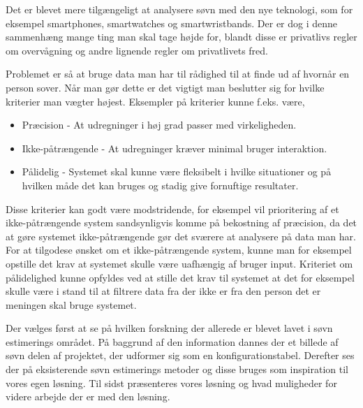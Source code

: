 \begin{comment}
Dette kapitel indeholder forskning omkring søvn, hvor forskellige metoder til at detektere søvn bliver beskrevet.
Hvorefter metoderne bliver sammenlignet med hinanden for at se på hvilket metoder vil kunne bruges til dette projekt.
Til slut vil der blive set på en enkelt metode i dybden som et proof of concept.
\end{comment}
Det er blevet mere tilgængeligt at analysere søvn med den nye teknologi, som for eksempel smartphones, smartwatches og smartwristbands.
Der er dog i denne sammenhæng mange ting man skal tage højde for, blandt disse er privatlivs regler om overvågning og andre lignende regler om privatlivets fred.

Problemet er så at bruge data man har til rådighed til at finde ud af hvornår en person sover.
Når man gør dette er det vigtigt man beslutter sig for hvilke kriterier man vægter højest.
Eksempler på kriterier kunne f.eks. være,

\begin{itemize}
	\item Præcision - At udregninger i høj grad passer med virkeligheden.
	\item Ikke-påtrængende - At udregninger kræver minimal bruger interaktion.
	\item Pålidelig - Systemet skal kunne være fleksibelt i hvilke situationer og på hvilken måde det kan bruges og stadig give fornuftige resultater.
\end{itemize}


Disse kriterier kan godt være modstridende, for eksempel vil prioritering af et ikke-påtrængende system sandsynligvis komme på bekostning af præcision, da det at gøre systemet ikke-påtrængende gør det sværere at analysere på data man har.
For at tilgodese ønsket om et ikke-påtrængende system, kunne man for eksempel opstille det krav at systemet skulle være uafhængig af bruger input.
Kriteriet om pålidelighed kunne opfyldes ved at stille det krav til systemet at det for eksempel skulle være i stand til at filtrere data fra der ikke er fra den person det er meningen skal bruge systemet.

Der vælges først at se på hvilken forskning der allerede er blevet lavet i søvn estimerings området.
På baggrund af den information dannes der et billede af søvn delen af projektet, der udformer sig som en konfigurationstabel.
Derefter ses der på eksisterende søvn estimerings metoder og disse bruges som inspiration til vores egen løsning.
Til sidst præsenteres vores løsning og hvad muligheder for videre arbejde der er med den løsning. 



